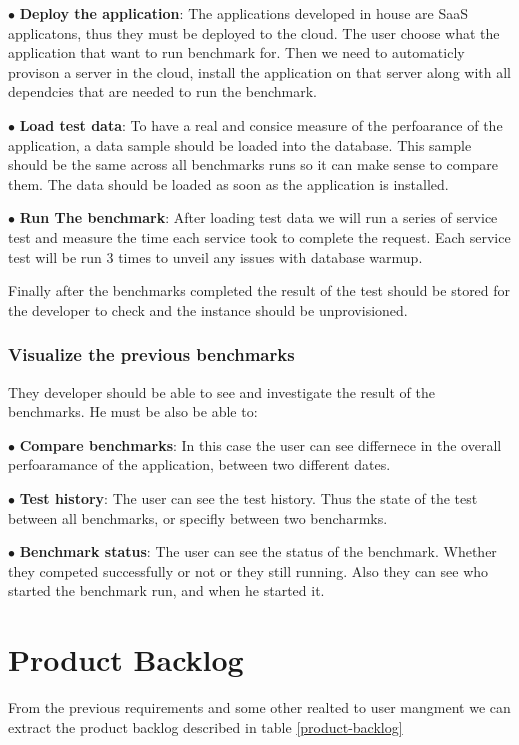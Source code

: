 $\bullet$ \textbf{Deploy the application}: The applications developed in house
are SaaS applicatons, thus they must be deployed to the cloud. The user choose
what the application that want to run benchmark for. Then we need to automaticly
provison a server in the cloud, install the application on that server along
with all dependcies that are needed to run the benchmark.

$\bullet$ \textbf{Load test data}: To have a real and consice measure of the
perfoarance of the application, a data sample should be loaded into the
database. This sample should be the same across all benchmarks runs so it can
make sense to compare them. The data should be loaded as soon as the application
is installed.

$\bullet$ \textbf{Run The benchmark}: After loading test data we will run a
series of service test and measure the time each service took to complete the
request. Each service test will be run 3 times to unveil any issues with
database warmup.

Finally after the benchmarks completed the result of the test should be stored
for the developer to check and the instance should be unprovisioned.

\subsubsection{Visualize the previous benchmarks}
They developer should be able to see and investigate the result of the
benchmarks. He must be also be able to:

$\bullet$ \textbf{Compare benchmarks}: In this case the user can see differnece
in the overall perfoaramance of the application, between two different dates.

$\bullet$ \textbf{Test history}: The user can see the test history. Thus the
state of the test between all benchmarks, or specifly between two bencharmks.

$\bullet$ \textbf{Benchmark status}: The user can see the status of the
benchmark. Whether they competed successfully or not or they still running. Also
they can see who started the benchmark run, and when he started it.

\section{Product Backlog}
From the previous requirements and some other realted to user mangment we can
extract the product backlog described in table \hyperref[product-backlog]{\ref{product-backlog}}

